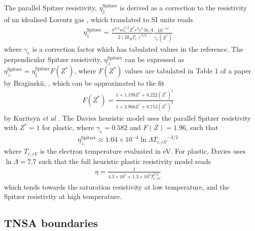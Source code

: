 \documentclass[12pt]{article}
\numberwithin{equation}{section}
\begin{document}
The parallel Spitzer resistivity, $\eta^\text{Spitzer}_\parallel$ is derived as a correction to the resistivity of an idealised Lorentz gas \cite{eta:Spitzer:Spitzer}, which translated to SI units reads
%
\begin{align}
  \eta^\text{Spitzer}_\parallel = \frac{\pi^{3/2}m_e^{1/2}Z^* e^2 c^4 \ln\Lambda}{2(2k_BT_{e})^{3/2}}\frac{10^{-14}}{\gamma_e(Z^*)}
\end{align}
%
where $\gamma_e$ is a correction factor which has tabulated values in the reference. The perpendicular Spitzer resistivity, $\eta^\text{Spitzer}_\perp$ can be expressed as $\eta^\text{Spitzer}_\perp=\eta^\text{Spitzer}_\parallel F(Z^*)$, where $F(Z^*)$ values are tabulated in Table 1 of a paper by Braginskii, \cite{eta:Spitzer:Braginskii}, which can be approximated to the fit
%
\begin{align}
  F(Z^*) = \frac{1 + 1.198Z^* + 0.222(Z^*)^2}{1 + 2.966Z^* + 0.753(Z^*)^2}
\end{align}
%
by Kuritsyn \textit{et al} \cite{eta:Spitzer:Kuritsyn}. The Davies heuristic model uses the parallel Spitzer resistivity with $Z^*=1$ for plastic, where $\gamma_e = 0.582$ and $F(Z)=1.96$, such that
%
\begin{align}
  \eta_\perp^\text{Spitzer} \approx 1.04\times 10^{-4} \ln\Lambda {T_{e,eV}}^{-3/2}
\end{align}
%
where $T_{e,eV}$ is the electron temperature evaluated in eV. For plastic, Davies uses $\ln\Lambda = 7.7$ such that the full heuristic plastic resistivity model reads
%
\begin{align}
  \eta = \frac{1}{4.3\times 10^5 + 1.3\times 10^3 T_{e,eV}^{3/2}}
\end{align}
%
which tends towards the saturation resistivity at low temperature, and the Spitzer resistivity at high temperature.

\subsection{TNSA boundaries} \label{sec:code:TNSA}
\end{document}
